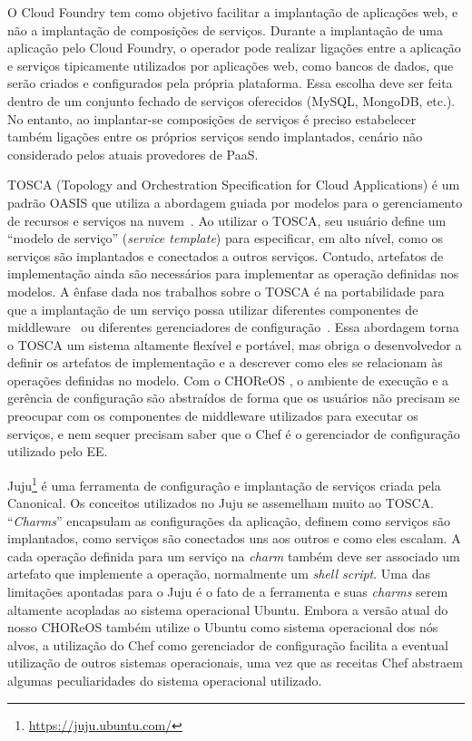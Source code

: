 O Cloud Foundry tem como objetivo facilitar a implantação de aplicações web, e não a implantação de composições de serviços. Durante a implantação de uma aplicação pelo Cloud Foundry, o operador pode realizar ligações entre a aplicação e serviços tipicamente utilizados por aplicações web, como bancos de dados, que serão criados e configurados pela própria plataforma. Essa escolha deve ser feita dentro de um conjunto fechado de serviços oferecidos (MySQL, MongoDB, etc.). No entanto, ao implantar-se composições de serviços é preciso estabelecer também ligações entre os próprios serviços sendo implantados, cenário não considerado pelos atuais provedores de PaaS.

TOSCA (Topology and Orchestration Specification for Cloud Applications)
é um padrão OASIS que utiliza a abordagem guiada por modelos para
o gerenciamento de recursos e serviços na nuvem~\cite{Wettinger2013Tosca}.
Ao utilizar o TOSCA, seu usuário define um ``modelo de serviço'' (\emph{service template})
para especificar, em alto nível, como os serviços são implantados e conectados a outros serviços.
Contudo, artefatos de implementação ainda são necessários
para implementar as operação definidas nos modelos.
A ênfase dada nos trabalhos sobre o TOSCA é na portabilidade
para que a implantação de um serviço possa utilizar diferentes
componentes de middleware~\cite{Wettinger2013ExtensiblePaaS} 
ou diferentes gerenciadores de configuração~\cite{Wettinger2013Tosca}.
Essa abordagem torna o TOSCA um sistema altamente flexível e portável,
mas obriga o desenvolvedor a definir os
artefatos de implementação e a descrever como eles se
relacionam às operações definidas no modelo.
Com o CHOReOS \ee, o ambiente de execução e a gerência de configuração são
abstraídos de forma que os usuários não precisam se preocupar
com os componentes de middleware utilizados para executar os serviços,
e nem sequer precisam saber que o Chef é o gerenciador de configuração
utilizado pelo EE.

Juju\footnote{\url{https://juju.ubuntu.com/}} é uma ferramenta 
de configuração e implantação de serviços criada pela Canonical.
Os conceitos utilizados no Juju se assemelham muito ao TOSCA.
``\emph{Charms}'' encapsulam as configurações da aplicação,
definem como serviços são implantados, como serviços
são conectados uns aos outros e como eles escalam.
A cada operação definida para um serviço na \emph{charm}
também deve ser associado um artefato que implemente a operação,
normalmente um \emph{shell script}.
Uma das limitações apontadas para o Juju é o fato
de a ferramenta e suas \emph{charms} serem altamente acopladas ao
sistema operacional Ubuntu.
Embora a versão atual do nosso CHOReOS \ee também utilize o Ubuntu
como sistema operacional dos nós alvos,
a utilização do Chef como gerenciador de configuração
facilita a eventual utilização de outros sistemas operacionais,
uma vez que as receitas Chef abstraem algumas peculiaridades
do sistema operacional utilizado.

